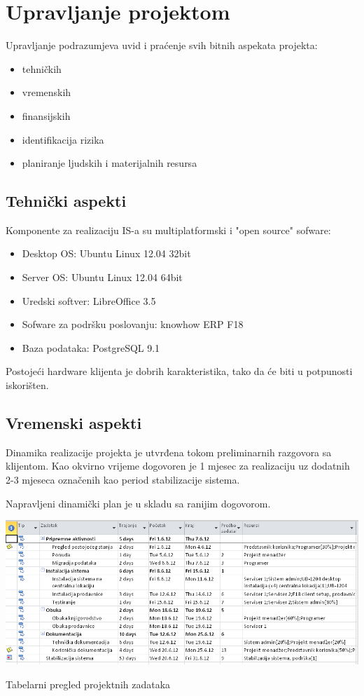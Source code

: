 \documentclass[times, utf8, seminar]{fit}
\begin{document}
\chapter{Upravljanje projektom}

Upravljanje podrazumjeva uvid i praćenje svih bitnih aspekata projekta:
\begin{itemize}
  \item tehničkih
  \item vremenskih
  \item finansijskih
  \item identifikacija rizika
  \item planiranje ljudskih i materijalnih resursa
\end{itemize}

\section{Tehnički aspekti}

Komponente za realizaciju IS-a su multiplatformski i "open source" sofware:
\begin{itemize}
  \item Desktop OS: Ubuntu Linux 12.04 32bit
  \item Server OS: Ubuntu Linux 12.04 64bit
  \item Uredski softver: LibreOffice 3.5
  \item Sofware za podršku poslovanju: knowhow ERP F18
  \item Baza podataka: PostgreSQL 9.1
\end{itemize}

Postojeći hardware klijenta je dobrih karakteristika, tako da će biti u potpunosti iskorišten.
\pagebreak
\section{Vremenski aspekti}

Dinamika realizacije projekta je utvrđena tokom preliminarnih razgovora sa klijentom. Kao okvirno vrijeme dogovoren je 1 mjesec za realizaciju uz dodatnih 2-3 mjeseca označenih kao period stabilizacije sistema. 

Napravljeni dinamički plan je u skladu sa ranijim dogovorom.

\begin{table}[!h]
\centering
\includegraphics[width=15.5cm]{img/dinamika_sheet.png}
\caption{Tabelarni pregled projektnih zadataka}
\end{table}
\end{document}
